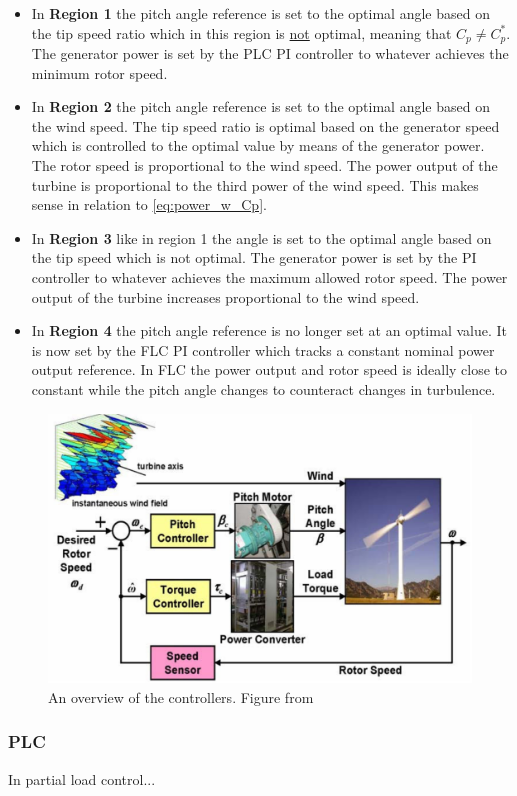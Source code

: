 \begin{itemize}
	\item In \textbf{Region 1} the pitch angle reference is set to the optimal angle based on the tip speed ratio which in this region is \underline{not} optimal, meaning that $ C_p \neq C_p^* $. The generator power is set by the PLC PI controller to whatever achieves the minimum rotor speed.
	\item In \textbf{Region 2} the pitch angle reference is set to the optimal angle based on the wind speed. The tip speed ratio is optimal based on the generator speed which is controlled to the optimal value by means of the generator power. The rotor speed is proportional to the wind speed. The power output of the turbine is proportional to the third power of the wind speed. This makes sense in relation to \cref{eq:power_w_Cp}.
	\item In \textbf{Region 3} like in region 1 the angle is set to the optimal angle based on the tip speed which is not optimal. The generator power is set by the PI controller to whatever achieves the maximum allowed rotor speed. The power output of the turbine increases proportional to the wind speed.
	\item In \textbf{Region 4} the pitch angle reference is no longer set at an optimal value. It is now set by the FLC PI controller which tracks a constant nominal power output reference. In FLC the power output and rotor speed is ideally close to constant while the pitch angle changes to counteract changes in turbulence.
\end{itemize}

\begin{figure}[ht]
	\centering
	\includegraphics[width=0.7\linewidth]{Graphics/GraphicalWtController.PNG}
	\caption{An overview of the controllers. Figure from \cite{Pao2009}}
	\label{fig:controller_overview}
\end{figure}

\subsubsection{PLC}
In partial load control...\\

